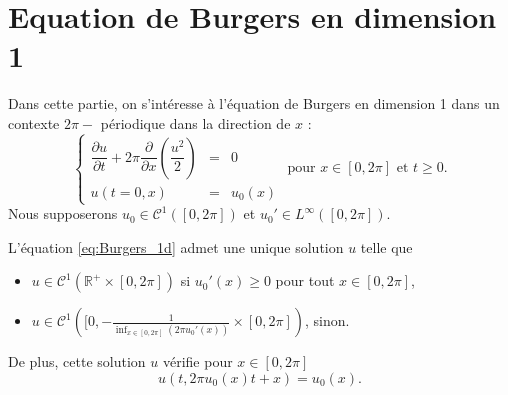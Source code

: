 \section{Equation de Burgers en dimension 1}

Dans cette partie, on s'intéresse à l'équation de Burgers \cite{Burgers1948, Witham1974} en dimension 1 dans un contexte $2 \pi -$ périodique dans la direction de $x$ :
\begin{equation}
\left\lbrace
\begin{array}{rcl}
\dfrac{\partial u}{\partial t} + 2 \pi \dfrac{\partial}{\partial x} \left( \dfrac{u^2}{2} \right) & = & 0 \\
u(t=0,x) & = & u_0(x)
\end{array}
\right. \text{ pour } x \in [0, 2\pi] \text{ et } t \geq 0.
\label{eq:Burgers_1d}
\end{equation}
Nous supposerons $u_0 \in \mathcal{C}^1([0,2 \pi])$ et $u_0' \in L^{\infty}([0,2 \pi])$.

\begin{theoreme}
L'équation \eqref{eq:Burgers_1d} admet une unique solution $u$ telle que
\begin{itemize}
\item $u \in \mathcal{C}^1(\mathbb{R}^+ \times [0, 2 \pi])$ si $u_0'(x) \geq 0$ pour tout $x \in [0,2 \pi]$,

\item $u \in \mathcal{C}^1([0, -\frac{1}{\inf_{x \in [0,2\pi]} (2 \pi u_0'(x))} \times [0, 2 \pi])$, sinon.
\end{itemize}
De plus, cette solution $u$ vérifie pour $x \in [0, 2 \pi]$
\begin{equation}
u(t,2 \pi u_0(x)t + x)=u_0(x).
\end{equation}
\end{theoreme}

